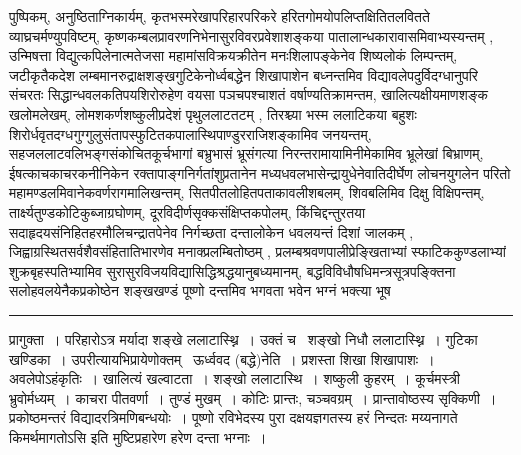 \documentclass[11pt, openany]{book}
\begin{document}
\noindent
पुष्पिकम्, अनुष्ठिताग्निकार्यम्, कृतभस्मरेखापरिहारपरिकरे हरितगोमयोपलिप्तक्षितितलवितते व्याघ्रचर्मण्युपविष्टम्, कृष्णकम्बलप्रावरणनिभेनासुरविवरप्रवेशाशङ्कया पातालान्धकारावासमिवाभ्यस्यन्तम् , उन्मिषत्ता विद्युत्कपिलेनात्मतेजसा महामांसविक्रयक्रीतेन मनःशिलापङ्केनेव शिष्यलोकं लिम्पन्तम्, जटीकृतैकदेश लम्बमानरुद्राक्षशङ्खगुटिकेनोर्ध्वबद्धेन शिखापाशेन बध्नन्तमिव विद्यावलेपदुर्विदग्धानुपरि संचरतः सिद्धान्धवलकतिपयशिरोरुहेण वयसा पञचपश्चाशतं वर्षाण्यतिक्रामन्तम, खालित्यक्षीयमाणशङ्क खलोमलेखम्, लोमशकर्णशष्कुलीप्रदेशं पृथुललाटतटम् , तिरश्च्या भस्म ललाटिकया बहुशः शिरोर्धवृतदग्धगुग्गुलुसंतापस्फुटितकपालास्थिपाण्डुरराजिशङ्कामिव जनयन्तम्, सहजललाटवलिभङ्गसंकोचितकूर्चभागां बभ्रुभासं भ्रूसंगत्या निरन्तरामायामिनीमेकामिव भ्रूलेखां बिभ्राणम्, ईषत्काचकाचरकनीनिकेन रक्तापाङ्गनिर्गतांशुप्रतानेन मध्यधवलभासेन्द्रायुधेनेवातिदीर्घेण लोचनयुगलेन परितो महामण्डलमिवानेकवर्णरागमालिखन्तम्, सितपीतलोहितपताकावलीशबलम्, शिवबलिमिव दिक्षु विक्षिपन्तम्, तार्क्ष्यतुण्डकोटिकुब्जाग्रघोणम्, दूरविदीर्णसृक्कसंक्षिप्तकपोलम्, किंचिद्दन्तुरतया सदाहृदयसंनिहितहरमौलिचन्द्रातपेनेव निर्गच्छता दन्तालोकेन धवलयन्तं दिशां जालकम् , जिह्वाग्रस्थितसर्वशैवसंहितातिभारणेव मनाक्प्रलम्बितोष्ठम् , प्रलम्बश्रवणपालीप्रेङ्खिताभ्यां स्फाटिककुण्डलाभ्यां शुक्रबृहस्पतिभ्यामिव सुरासुरविजयविद्यासिद्धिश्रद्धयानुबध्यमानम्, बद्धविविधौषधिमन्त्रसूत्रपङ्क्तिना सलोहवलयेनैकप्रकोष्ठेन शङ्खखण्डं पूष्णो दन्तमिव भगवता भवेन भग्नं भक्त्या भूष\textendash

\vspace{2mm}
\hrule

\noindent
{\s प्रागुक्ता~। परिहारोऽत्र मर्यादा शङ्खे ललाटास्थ्नि~। उक्तं च \textendash\ शङ्खो निधौ ललाटास्थ्नि~। गुटिका खण्डिका~। उपरीत्यायभिप्रायेणोक्तम् \textendash\ {\qtt ऊर्ध्ववद (बद्धे)नेति}~। प्रशस्ता शिखा शिखापाशः~। अवलेपोऽहंकृतिः~। खालित्यं खल्वाटता~। शङ्खो ललाटास्थि~। शष्कुली कुहरम्~। {\qt कूर्चमस्त्री भ्रुवोर्मध्यम्}~। काचरा पीतवर्णा~। तुण्डं मुखम्~। कोटिः प्रान्तः, चञ्चवग्रम्~। {\qt प्रान्तावोष्ठस्य सृक्किणी}~। {\qt प्रकोष्ठमन्तरं विद्यादरत्रिमणिबन्धयोः}~। पूष्णो रविभेदस्य पुरा दक्षयज्ञगतस्य हरं निन्दतः मय्यनागते किमर्थमागतोऽसि इति मुष्टिप्रहारेण हरेण दन्ता भग्नाः~।}

\newpage
\end{document}
